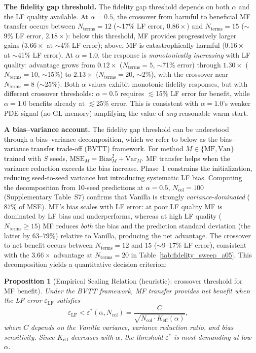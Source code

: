 \documentclass[11pt]{article}
\newcommand{\Ncol}{N_{\mathrm{col}}}
\newtheorem{Proposition}{Proposition}
\begin{document}
\textbf{The fidelity gap threshold.} The fidelity gap threshold depends on both $\alpha$ and the LF quality available. At $\alpha = 0.5$, the crossover from harmful to beneficial MF transfer occurs between $N_{\mathrm{terms}} = 12$ ($\sim$17\% LF error, $0.86\times$) and $N_{\mathrm{terms}} = 15$ ($\sim$9\% LF error, $2.18\times$): below this threshold, MF provides progressively larger gains ($3.66\times$ at $\sim$4\% LF error); above, MF is catastrophically harmful ($0.16\times$ at $\sim$41\% LF error). At $\alpha = 1.0$, the response is \emph{monotonically increasing} with LF quality: advantage grows from $0.12\times$ ($N_{\mathrm{terms}} = 5$, $\sim$71\% error) through $1.30\times$ ($N_{\mathrm{terms}} = 10$, $\sim$15\%) to $2.13\times$ ($N_{\mathrm{terms}} = 20$, $\sim$2\%), with the crossover near $N_{\mathrm{terms}} = 8$ ($\sim$25\%). Both $\alpha$ values exhibit monotonic fidelity responses, but with different crossover thresholds: $\alpha = 0.5$ requires $\lesssim$15\% LF error for benefit, while $\alpha = 1.0$ benefits already at $\lesssim$25\% error. This is consistent with $\alpha = 1.0$'s weaker PDE signal (no GL memory) amplifying the value of \emph{any} reasonable warm start.

\textbf{A bias--variance account.} The fidelity gap threshold can be understood through a bias--variance decomposition, which we refer to below as the bias--variance transfer trade-off (BVTT) framework. For method $M \in \{\text{MF}, \text{Van}\}$ trained with $S$ seeds, $\mathrm{MSE}_M = \mathrm{Bias}^2_M + \mathrm{Var}_M$. MF transfer helps when the variance reduction exceeds the bias increase. Phase~1 constrains the initialization, reducing seed-to-seed variance but introducing systematic LF bias. Computing the decomposition from 10-seed predictions at $\alpha = 0.5$, $\Ncol = 100$ (Supplementary Table~S7) confirms that Vanilla is strongly \emph{variance-dominated} ($87\%$ of MSE). MF's bias scales with LF error: at poor LF quality MF is dominated by LF bias and underperforms, whereas at high LF quality ($N_{\mathrm{terms}} \geq 15$) MF reduces \emph{both} the bias and the prediction standard deviation (the latter by $63$--$79\%$) relative to Vanilla, producing the net advantage. The crossover to net benefit occurs between $N_{\mathrm{terms}} = 12$ and $15$ ($\sim$9--17\% LF error), consistent with the $3.66\times$ advantage at $N_{\mathrm{terms}} = 20$ in Table~\ref{tab:fidelity_sweep_a05}. This decomposition yields a quantitative decision criterion:

\begin{Proposition}[Empirical Scaling Relation (heuristic): crossover threshold for MF benefit]
\label{prop:crossover}
Under the BVTT framework, MF transfer provides net benefit when the LF error $\varepsilon_{\mathrm{LF}}$ satisfies
\begin{equation}
\label{eq:crossover}
\varepsilon_{\mathrm{LF}} < \varepsilon^*(\alpha, \Ncol) = \frac{C}{\sqrt{\Ncol \cdot K_{\mathrm{eff}}(\alpha)}},
\end{equation}
where $C$ depends on the Vanilla variance, variance reduction ratio, and bias sensitivity. Since $K_{\mathrm{eff}}$ decreases with $\alpha$, the threshold $\varepsilon^*$ is most demanding at low $\alpha$.
\end{Proposition}
\end{document}
